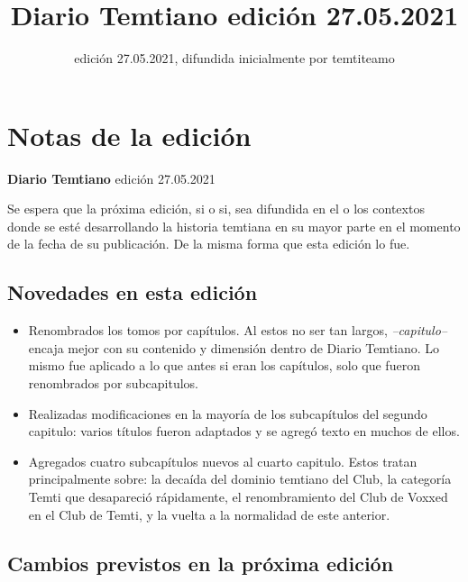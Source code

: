 \documentclass[
  spanish,
]{book}
\title{Diario Temtiano edición 27.05.2021}
\author{}
\date{\vspace{-2.5em}edición 27.05.2021, difundida inicialmente por temtiteamo}
\providecommand{\tightlist}{%
  \setlength{\itemsep}{0pt}\setlength{\parskip}{0pt}}
\begin{document}
\maketitle

{
\setcounter{tocdepth}{1}
\tableofcontents
}
\hypertarget{notas-de-la-ediciuxf3n}{%
\chapter*{Notas de la edición}\label{notas-de-la-ediciuxf3n}}

\textbf{Diario Temtiano} edición 27.05.2021

Se espera que la próxima edición, si o si, sea difundida en el o los contextos donde se esté desarrollando la historia temtiana en su mayor parte en el momento de la fecha de su publicación. De la misma forma que esta edición lo fue.

\hypertarget{novedades-en-esta-ediciuxf3n}{%
\section*{Novedades en esta edición}\label{novedades-en-esta-ediciuxf3n}}

\begin{itemize}
\tightlist
\item
  Renombrados los tomos por capítulos. Al estos no ser tan largos, \emph{--capitulo--} encaja mejor con su contenido y dimensión dentro de Diario Temtiano. Lo mismo fue aplicado a lo que antes si eran los capítulos, solo que fueron renombrados por subcapitulos.
\item
  Realizadas modificaciones en la mayoría de los subcapítulos del segundo capitulo: varios títulos fueron adaptados y se agregó texto en muchos de ellos.
\item
  Agregados cuatro subcapítulos nuevos al cuarto capitulo. Estos tratan principalmente sobre: la decaída del dominio temtiano del Club, la categoría Temti que desapareció rápidamente, el renombramiento del Club de Voxxed en el Club de Temti, y la vuelta a la normalidad de este anterior.
\end{itemize}

\hypertarget{cambios-previstos-en-la-pruxf3xima-ediciuxf3n}{%
\section*{Cambios previstos en la próxima edición}\label{cambios-previstos-en-la-pruxf3xima-ediciuxf3n}}
\end{document}
